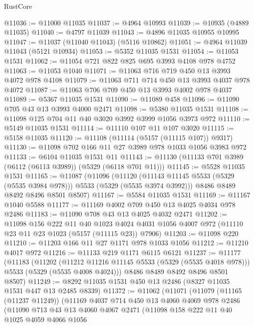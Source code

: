 \begin{lexlean}{RustCore}
\begin{coremodule}
@11036 := @11000 @11035
@11037 := @4964 @10993
@11039 := @10935 (@4889 @11035)
@11040 := @4797 @11039
@11043 := @4896 @11035 @10955 @10995
@11047 := @11037 (@11040 @11043) (@5116 @10862)
@11051 := @4964 @11039 @11043 (@5121 @10934)
@11053 := @5352 @11035 @1531
@11054 := @11053 @1531
@11062 := @11054 @721 @822 @825 @695 @3993 @4108 @978 @4752
@11063 := @11053 @1040
@11071 := @11063 @716 @719 @450 @13 @3993 @4072 @978 @4108
@11079 := @11063 @711 @714 @450 @13 @3993 @4037 @978 @4072
@11087 := @11063 @706 @709 @450 @13 @3993 @4002 @978 @4037
@11089 := @5367 @11035 @1531
@11090 := @11089 @458
@11096 := @11090 @705 @43 @13 @3993 @4000 @2471
@11098 := @5380 @11035 @1531
@11108 := @11098 @125 @704 @11 @40 @3020 @3992 @3999 @1056 @3973 @972
@11110 := @5149 @11035 @1531
@11114 := @11110 @107 @11 @107 @3020
@11115 := @5158 @11035
@11120 := @11108 (@11114 (@5157 (@11115 @107)) @9317)
@11130 := @11098 @702 @166 @11 @27 @3989 @978 @1033 @1056 @3983 @972
@11133 := @6104 @11035 @1531 @11
@11143 := @11130 (@11133 @701 @3989 (@6112 (@6113 @3989)) (@5329 (@6118 @701 @11)))
@11145 := @5528 @11035 @1531
@11165 := @11087
    (@11096
      (@11120 (@11143 @11145 @5533 (@5329 (@5535 @3984 @978))) @5533 (@5329 (@5535 @3974 @3992)))
      @8486
      @8489
      @8492
      @8496
      @8501
      @8507)
@11167 := @5584 @11035 @1531
@11169 := @11167 @1040 @5588
@11177 := @11169 @4002 @709 @450 @13 @4025 @4034 @978 @2486
@11183 := @11090 @708 @43 @13 @4025 @4032 @2471
@11202 := @11098
    @156
    @222
    @11
    @40
    @1023
    @4024
    @4031
    @1056
    @4007
    @972
    (@11110 @23 @11 @23 @1023 (@5157 (@11115 @23)) @7906)
@11203 := @11098 @220
@11210 := @11203 @166 @11 @27 @1171 @978 @1033 @1056
@11212 := @11210 @4017 @972
@11216 := @11133 @219 @1171 @6115 @6121
@11237 := @11177
    (@11183
      (@11202
        (@11212 @11216 @11145 @5533 (@5329 (@5535 @4018 @978)))
        @5533
        (@5329 (@5535 @4008 @4024)))
      @8486
      @8489
      @8492
      @8496
      @8501
      @8507)
@11249 := @8292 @11035 @1531 @450 @13 @2486 (@8327 @11035 @1531 @447 @13 @2485 @8339)
@11372 := @11062
    (@11071
      (@11079
        (@11165 (@11237 @11249))
        (@11169
          @4037
          @714
          @450
          @13
          @4060
          @4069
          @978
          @2486
          (@11090
            @713
            @43
            @13
            @4060
            @4067
            @2471
            (@11098
              @158
              @222
              @11
              @40
              @1025
              @4059
              @4066
              @1056

\end{coremodule}
\end{lexlean}
